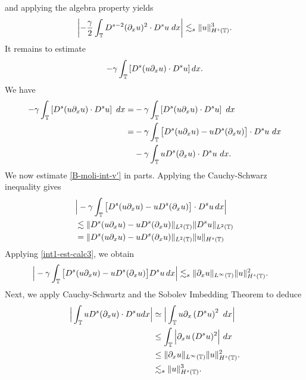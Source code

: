 and applying the algebra property yields
\begin{equation}
\label{hl2-prime}
\left | -\frac{\gamma}{2} \int_{\mathbb{T}} D^{s-2} (\partial_x u)^2 \cdot
D^s u \; dx \right |
\lesssim_{s}  \|u\|_{H^s(\mathbb{T})}^3.
\end{equation}
It remains to estimate 
\begin{equation*}
- \gamma \int_{\mathbb{T}} \left [  D^s (u \partial_x u) \cdot
D^s u \right ]  dx.
\end{equation*}
We have
\begin{equation} 
\begin{split}
\label{B-moli-int-v'}
-  \gamma \int_{\mathbb{T}} \left [D^s (u \partial_x u) \cdot D^s
u \right ] \ dx
= &- \gamma  \int_{\mathbb{T}}
\left [ D^s(u \partial_x u) \cdot   D^s u \right ] \ dx
\\
=& - \gamma \int_{\mathbb{T}}
\big[ 
D^s(u\partial_x u)  -  u D^s (\partial_xu)
\big] \cdot
D^s u   \ dx
\\
&
- \gamma \int_{\mathbb{T}}
u D^s (\partial_xu) \cdot
D^su \ dx.
\end{split}
\end{equation}
%
%
%
We now estimate \eqref{B-moli-int-v'} in parts. Applying the Cauchy-Schwarz inequality gives
%
\begin{equation*} 
\begin{split}
& \Big|
- \gamma \int_{\mathbb{T}}
\big[ 
D^s(u\partial_x u)  -  u D^s (\partial_xu)
\big] \cdot
D^s u   \, dx
\Big|
\\
& \lesssim
 \|
D^s(u\partial_x u)  -  u D^s (\partial_xu)
\|_{L^2(\mathbb{T})}
\|
D^s u 
\|_{L^2(\mathbb{T})}
\\
& =
 \| D^s(u\partial_x u)  -  u D^s (\partial_xu)
\|_{L^2(\mathbb{T})}
\|
u
\|_{H^s(\mathbb{T})}
\end{split}
\end{equation*}
Applying \eqref{int1-est-calc3}, we obtain
\begin{equation*}
\begin{split}
\Big|
- \gamma \int_{\mathbb{T}}
\big[ 
D^s(u\partial_x u)  -  u D^s (\partial_xu)
\big]
D^s u   \, dx
\Big|
&\lesssim_{s}
\| \partial_x u \|_{L^\infty(\mathbb{T})} 
\| u \|_{H^s(\mathbb{T})}^2.
\end{split}
\end{equation*}
%
Next, we apply Cauchy-Schwartz and the Sobolev Imbedding Theorem to deduce 
%
%
%
\begin{equation} 
\label{int1-est-calc5'}
\begin{split}
\Big|
\int_{\mathbb{T}}
u D^s (\partial_x u)
\cdot  D^s u  dx
\Big|
& \simeq 
 \Big|
\int_{\mathbb{T}}
u \partial_x\left(D^s u\right)^2  \ dx
\Big|
\\
& \le
 \int_{\mathbb{T}} \Big |
\partial_x u \, (D^s u)^2  
\Big| \ dx
\\
& \le
\| \partial_x u \|_{L^\infty(\mathbb{T})} 
\| u \|_{H^s(\mathbb{T})}^2.
\\
& \lesssim_{s}  \|u\|_{H^s(\mathbb{T})}^3.
\end{split}
\end{equation}
